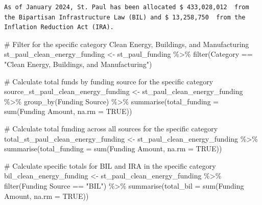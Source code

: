 \documentclass[
  letterpaper,
  DIV=11,
  numbers=noendperiod]{scrartcl}
\newenvironment{Shaded}{\begin{snugshade}}{\end{snugshade}}
\newcommand{\AttributeTok}[1]{\textcolor[rgb]{0.40,0.45,0.13}{#1}}
\newcommand{\CommentTok}[1]{\textcolor[rgb]{0.37,0.37,0.37}{#1}}
\newcommand{\ConstantTok}[1]{\textcolor[rgb]{0.56,0.35,0.01}{#1}}
\newcommand{\FunctionTok}[1]{\textcolor[rgb]{0.28,0.35,0.67}{#1}}
\newcommand{\NormalTok}[1]{\textcolor[rgb]{0.00,0.23,0.31}{#1}}
\newcommand{\OtherTok}[1]{\textcolor[rgb]{0.00,0.23,0.31}{#1}}
\newcommand{\SpecialCharTok}[1]{\textcolor[rgb]{0.37,0.37,0.37}{#1}}
\newcommand{\StringTok}[1]{\textcolor[rgb]{0.13,0.47,0.30}{#1}}
\begin{document}
\begin{verbatim}
As of January 2024, St. Paul has been allocated $ 433,028,012  from the Bipartisan Infrastructure Law (BIL) and $ 13,258,750  from the Inflation Reduction Act (IRA).
\end{verbatim}

\begin{Shaded}
\begin{Highlighting}[]
\CommentTok{\# Filter for the specific category \textquotesingle{}Clean Energy, Buildings, and Manufacturing\textquotesingle{}}
\NormalTok{st\_paul\_clean\_energy\_funding }\OtherTok{\textless{}{-}}\NormalTok{ st\_paul\_funding }\SpecialCharTok{\%\textgreater{}\%}
  \FunctionTok{filter}\NormalTok{(Category }\SpecialCharTok{==} \StringTok{"Clean Energy, Buildings, and Manufacturing"}\NormalTok{)}

\CommentTok{\# Calculate total funds by funding source for the specific category}
\NormalTok{source\_st\_paul\_clean\_energy\_funding }\OtherTok{\textless{}{-}}\NormalTok{ st\_paul\_clean\_energy\_funding }\SpecialCharTok{\%\textgreater{}\%}
  \FunctionTok{group\_by}\NormalTok{(}\StringTok{\textasciigrave{}}\AttributeTok{Funding Source}\StringTok{\textasciigrave{}}\NormalTok{) }\SpecialCharTok{\%\textgreater{}\%}
  \FunctionTok{summarise}\NormalTok{(}\AttributeTok{total\_funding =} \FunctionTok{sum}\NormalTok{(}\StringTok{\textasciigrave{}}\AttributeTok{Funding Amount}\StringTok{\textasciigrave{}}\NormalTok{, }\AttributeTok{na.rm =} \ConstantTok{TRUE}\NormalTok{))}

\CommentTok{\# Calculate total funding across all sources for the specific category}
\NormalTok{total\_st\_paul\_clean\_energy\_funding }\OtherTok{\textless{}{-}}\NormalTok{ st\_paul\_clean\_energy\_funding }\SpecialCharTok{\%\textgreater{}\%}
  \FunctionTok{summarise}\NormalTok{(}\AttributeTok{total\_funding =} \FunctionTok{sum}\NormalTok{(}\StringTok{\textasciigrave{}}\AttributeTok{Funding Amount}\StringTok{\textasciigrave{}}\NormalTok{, }\AttributeTok{na.rm =} \ConstantTok{TRUE}\NormalTok{))}

\CommentTok{\# Calculate specific totals for BIL and IRA in the specific category}
\NormalTok{bil\_clean\_energy\_funding }\OtherTok{\textless{}{-}}\NormalTok{ st\_paul\_clean\_energy\_funding }\SpecialCharTok{\%\textgreater{}\%}
  \FunctionTok{filter}\NormalTok{(}\StringTok{\textasciigrave{}}\AttributeTok{Funding Source}\StringTok{\textasciigrave{}} \SpecialCharTok{==} \StringTok{"BIL"}\NormalTok{) }\SpecialCharTok{\%\textgreater{}\%}
  \FunctionTok{summarise}\NormalTok{(}\AttributeTok{total\_bil =} \FunctionTok{sum}\NormalTok{(}\StringTok{\textasciigrave{}}\AttributeTok{Funding Amount}\StringTok{\textasciigrave{}}\NormalTok{, }\AttributeTok{na.rm =} \ConstantTok{TRUE}\NormalTok{))}


\end{Highlighting}
\end{Shaded}
\end{document}
